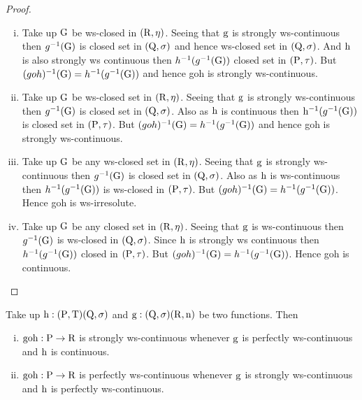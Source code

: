 \begin{proof}
\begin{enumerate}[(i)]
\item Take up $\mathrm{G}$ be ws-closed in $(\mathrm{R},\eta)$. Seeing that $\mathrm{g}$ is strongly ws-continuous then $g^{-1}(\mathrm{G})$ is closed set in $(\mathrm{Q},\sigma)$ and hence ws-closed set in $(\mathrm{Q},\sigma)$. And $\mathrm{h}$ is also strongly ws continuous then $h^{-1} (g^{-1}(\mathrm{G}))$ closed set in $(\mathrm{P},\tau)$. But $(goh)^{-1}(\mathrm{G}) =h^{-1}(g^{-1}(\mathrm{G}))$ and hence goh is strongly ws-continuous.

\item Take up $\mathrm{G}$ be ws-closed set in $(\mathrm{R},\eta)$. Seeing that $\mathrm{g}$ is strongly ws-continuous then $g^{-1}(\mathrm{G})$ is closed set in $(\mathrm{Q},\sigma)$. Also as $\mathrm{h}$ is continuous then $\mathrm{h}^{-1}(g^{-1}(\mathrm{G}))$ is closed set in $(\mathrm{P},\tau)$. But $(goh)^{-1}(\mathrm{G}) = h^{-1} (g^{-1} (\mathrm{G}))$ and hence goh is strongly ws-continuous.

\item Take up $\mathrm{G}$ be any ws-closed set in $(\mathrm{R}, \eta)$. Seeing that $\mathrm{g}$ is strongly ws-continuous then $g^{-1}(\mathrm{G})$ is closed set in $(\mathrm{Q},\sigma)$. Also as $\mathrm{h}$ is ws-continuous then $h^{-1}(g^{-1}(\mathrm{G}))$ is ws-closed in $(\mathrm{P},\tau )$. But $(goh)^{-1}(\mathrm{G}) = h^{-1}(g^{-1}(\mathrm{G}))$. Hence goh is ws-irresolute.

\item Take up $\mathrm{G}$ be any closed set in $(\mathrm{R},\eta)$. Seeing that $\mathrm{g}$ is ws-continuous then $g^{-1} (\mathrm{G})$ is ws-closed in $(\mathrm{Q},\sigma)$. Since $\mathrm{h}$ is strongly ws continuous then $h^{-1} (g^{-1}(\mathrm{G}))$ closed in $(\mathrm{P},\tau)$. But $(goh)^{-1}(\mathrm{G}) = h^{-1} (g^{-1}(\mathrm{G}))$. Hence goh is continuous.
\end{enumerate}
\end{proof}

\begin{thm}\label{thm3.3.13}
Take up $\mathrm{h}: (\mathrm{P},\mathrm{T})(\mathrm{Q},\sigma)$ and $\mathrm{g}: (\mathrm{Q},\sigma)(\mathrm{R},\mathrm{n})$ be two functions. Then
\begin{enumerate}[(i)]
\item $\text{goh}: \mathrm{P}\to \mathrm{R}$ is strongly ws-continuous whenever $\mathrm{g}$ is perfectly ws-continuous and $\mathrm{h}$ is continuous.
\item $\text{goh}: \mathrm{P}\to \mathrm{R}$ is perfectly ws-continuous whenever $\mathrm{g}$ is strongly ws-continuous and $\mathrm{h}$ is perfectly ws-continuous.
\end{enumerate}
\end{thm}

